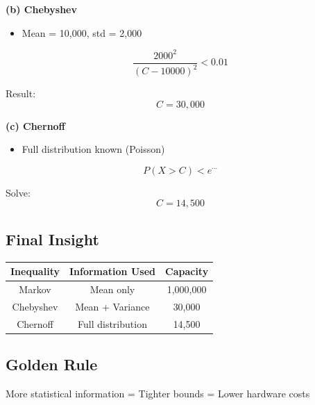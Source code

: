 \documentclass[11pt]{article}
\begin{document}
\textbf{(b) Chebyshev}
\begin{itemize}
\item Mean = 10,000, std = 2,000
\end{itemize}

\[
\frac{2000^2}{(C - 10000)^2} < 0.01
\]

Result:
\[
C = 30,000
\]

\textbf{(c) Chernoff}
\begin{itemize}
\item Full distribution known (Poisson)
\end{itemize}

\[
P(X > C) < e^{\cdots}
\]

Solve:
\[
C = 14,500
\]

\subsection{Final Insight}

\begin{tabular}{|c|c|c|}
\hline
Inequality & Information Used & Capacity \\
\hline
Markov & Mean only & 1,000,000 \\
Chebyshev & Mean + Variance & 30,000 \\
Chernoff & Full distribution & 14,500 \\
\hline
\end{tabular}

\subsection{Golden Rule}
More statistical information = Tighter bounds = Lower hardware costs
\end{document}
